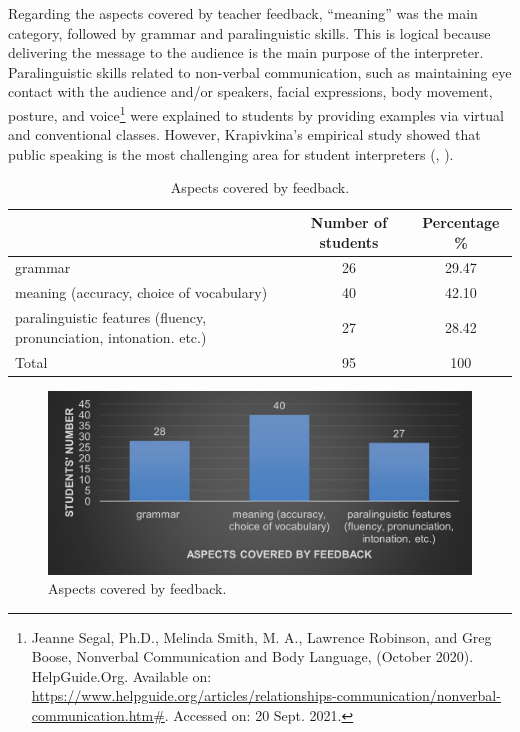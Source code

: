 \documentclass[english]{textolivre}
\begin{document}
Regarding the aspects covered by teacher feedback, “meaning” was the main category, followed by grammar and paralinguistic skills. This is logical because delivering the message to the audience is the main purpose of the interpreter. Paralinguistic skills related to non-verbal communication, such as maintaining eye contact with the audience and/or speakers, facial expressions, body movement, posture, and voice\footnote{Jeanne Segal, Ph.D., Melinda Smith, M. A., Lawrence Robinson, and Greg Boose, Nonverbal Communication and Body Language, (October 2020). HelpGuide.Org. Available on: \url{https://www.helpguide.org/articles/relationships-communication/nonverbal-communication.htm\#}. Accessed on: 20 Sept. 2021.} were explained to students by providing examples via virtual and conventional classes. However, Krapivkina’s empirical study showed that public speaking is the most challenging area for student interpreters \cite[p. 695]{krapivkina_sight_2018} (, ).

\begin{table}[h!]
\centering
\begin{threeparttable}
\caption{Aspects covered by feedback.}
\label{tbl2}
\centering
\begin{tabular}{p{} c c}
\toprule
 & Number of students & Percentage \% \\ \midrule
grammar & 26 & 29.47  \\ 
meaning (accuracy, choice of vocabulary) & 40 & 42.10 \\
paralinguistic features (fluency, pronunciation, intonation. etc.) & 27 & 28.42 \\
Total & 95 & 100 \\
\bottomrule
\end{tabular}
\end{threeparttable}
\end{table}

\begin{figure}[h!]
 \centering
 \begin{minipage}{.85\textwidth}
 \includegraphics[width=\textwidth]{02.jpg}
 \caption{Aspects covered by feedback.}
 \label{fig02}
 \end{minipage}
\end{figure}
\end{document}
